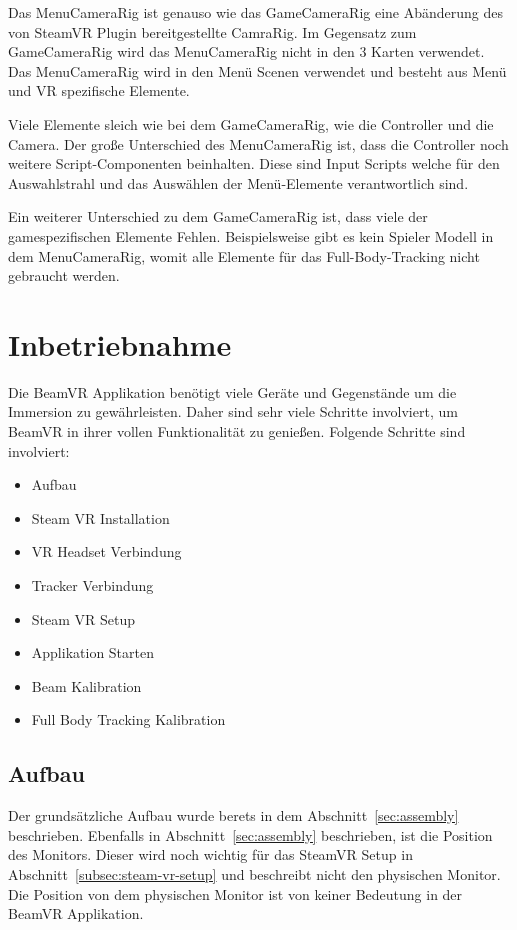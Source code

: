 Das MenuCameraRig ist genauso wie das GameCameraRig eine Abänderung des von SteamVR Plugin bereitgestellte CamraRig.
Im Gegensatz zum GameCameraRig wird das MenuCameraRig nicht in den 3 Karten verwendet.
Das MenuCameraRig wird in den Menü Scenen verwendet und besteht aus Menü und VR spezifische Elemente.

Viele Elemente sleich wie bei dem GameCameraRig, wie die Controller und die Camera.
Der große Unterschied des MenuCameraRig ist, dass die Controller noch weitere Script-Componenten beinhalten.
Diese sind Input Scripts welche für den Auswahlstrahl und das Auswählen der Menü-Elemente verantwortlich sind.


Ein weiterer Unterschied zu dem GameCameraRig ist, dass viele der gamespezifischen Elemente Fehlen.
Beispielsweise gibt es kein Spieler Modell in dem MenuCameraRig, womit alle Elemente für das Full-Body-Tracking nicht gebraucht werden.

\section{Inbetriebnahme}
\label{sec:commissioning}

Die BeamVR Applikation benötigt viele Geräte und Gegenstände um die Immersion zu gewährleisten.
Daher sind sehr viele Schritte involviert, um BeamVR in ihrer vollen Funktionalität zu genießen.
Folgende Schritte sind involviert:

\begin{itemize}
    \item Aufbau
    \item Steam VR Installation
    \item VR Headset Verbindung
    \item Tracker Verbindung
    \item Steam VR Setup
    \item Applikation Starten
    \item Beam Kalibration
    \item Full Body Tracking Kalibration
\end{itemize}


\subsection{Aufbau}

Der grundsätzliche Aufbau wurde berets in dem Abschnitt~\ref{sec:assembly} beschrieben.
Ebenfalls in Abschnitt~\ref{sec:assembly} beschrieben, ist die Position des Monitors.
Dieser wird noch wichtig für das SteamVR Setup in Abschnitt~\ref{subsec:steam-vr-setup} und beschreibt nicht den physischen Monitor.
Die Position von dem physischen Monitor ist von keiner Bedeutung in der BeamVR Applikation.

